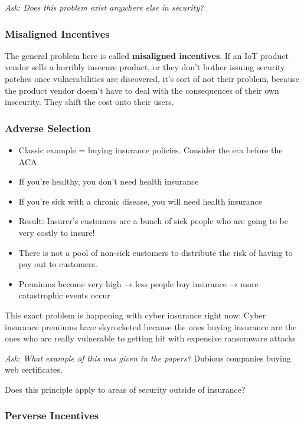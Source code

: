 \documentclass[11pt]{article}
\begin{document}
{\it Ask: Does this problem exist anywhere else in security?}

\subsubsection{Misaligned Incentives}

The general problem here is called {\bf misaligned incentives}. If an IoT product vendor sells a horribly insecure product, or they don't bother issuing security patches once vulnerabilities are discovered, it's sort of not their problem, because the product vendor doesn't have to deal with the consequences of their own insecurity. They shift the cost onto their users. 

\subsubsection{Adverse Selection}


\begin{itemize}
    \item Classic example = buying insurance policies. Consider the era before the ACA
    \item If you're healthy, you don't need health insurance
    \item If you're sick with a chronic disease, you will need health insurance
    \item Result: Insurer's customers are a bunch of sick people who are going to be very costly to insure!
    \item There is not a pool of non-sick customers to distribute the risk of having to pay out to customers. 
    \item Premiums become very high → less people buy insurance → more catastrophic events occur
\end{itemize}

This exact problem is happening with cyber insurance right now: Cyber insurance premiums have skyrocketed because the ones buying insurance are the ones who are really vulnerable to getting hit with expensive ransomware attacks

{\it Ask: What example of this was given in the papers?} Dubious companies buying web certificates. 

Does this principle apply to areas of security outside of insurance?

\subsubsection{Perverse Incentives}
\end{document}
